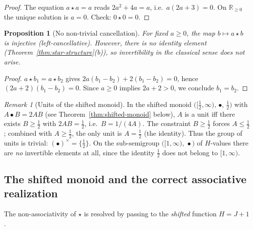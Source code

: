 \documentclass[11pt,a4paper]{article}
\theoremstyle{plain}
\newtheorem{proposition}[theorem]{Proposition}
\theoremstyle{definition}
\theoremstyle{remark}
\newtheorem{remark}[theorem]{Remark}
\newcommand{\Jcost}{J}
\newcommand{\RR}{\mathbb{R}}
\begin{document}
\begin{proof}
The equation $a\star a=a$ reads $2a^2+4a=a$, i.e.\ $a(2a+3)=0$.
On $\RR_{\ge0}$ the unique solution is $a=0$.  Check:
$0\star0=0$.
\end{proof}

\begin{proposition}[No non-trivial cancellation]\label{prop:cancel}
For fixed $a\ge0$, the map $b\mapsto a\star b$ is injective
(left-cancellative).  However, there is no identity element
(Theorem~\ref{thm:star-structure}(b)), so invertibility in the
classical sense does not arise.
\end{proposition}

\begin{proof}
$a\star b_1=a\star b_2$ gives $2a(b_1-b_2)+2(b_1-b_2)=0$,
hence $(2a+2)(b_1-b_2)=0$.  Since $a\ge0$ implies $2a+2>0$,
we conclude $b_1=b_2$.
\end{proof}

\begin{remark}[Units of the shifted monoid]\label{rem:shifted-units}
In the shifted monoid
$\bigl([\tfrac12,\infty),\,\bullet,\,\tfrac12\bigr)$ with
$A\bullet B=2AB$ (see Theorem~\ref{thm:shifted-monoid} below),
$A$ is a unit iff there exists $B\ge\tfrac12$ with
$2AB=\tfrac12$, i.e.\ $B=1/(4A)$.  The constraint
$B\ge\tfrac12$ forces $A\le\tfrac12$; combined with
$A\ge\tfrac12$, the only unit is $A=\tfrac12$ (the identity).
Thus the group of units is trivial: $(\bullet)^{\times}=\{\tfrac12\}$.
On the sub-semigroup $\bigl([1,\infty),\,\bullet\bigr)$ of
$H$-values there are \emph{no} invertible elements at all, since
the identity $\tfrac12$ does not belong to $[1,\infty)$.
\end{remark}

\subsection{The shifted monoid and the correct associative realization}
\label{ssec:shifted}

The non-associativity of $\star$ is resolved by passing to the
\emph{shifted} function $H=\Jcost+1$.
\end{document}
